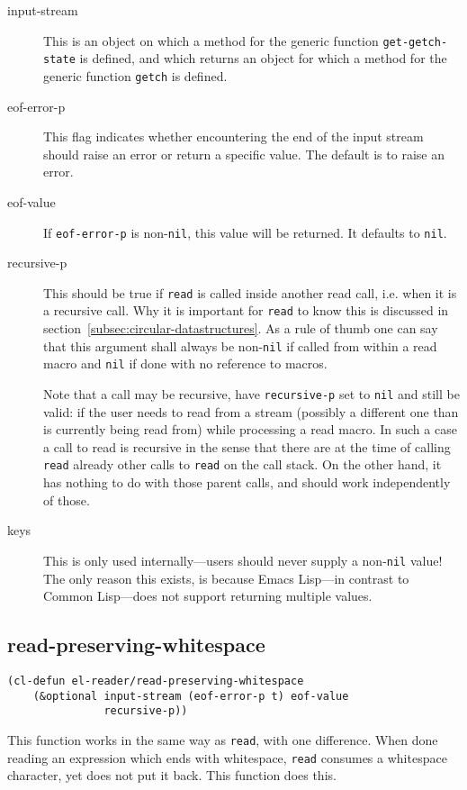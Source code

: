 \documentclass[a4paper,10pt,twoside]{report}
\newcommand{\el}{Emacs Lisp}
\newcommand{\cl}{Common Lisp}
\newcommand{\sym}[1]{\texttt{#1}}
\newcommand{\fun}[1]{\texttt{#1}}
\newcommand{\Read}{\fun{read}}
\newcommand{\nil}{\sym{nil}}
\begin{document}
\begin{description}
\item[input-stream] This is an object on which a method for the generic function
  \fun{get-getch-state} is defined, and which returns an object for which a
  method for the generic function \fun{getch} is defined.
\item[eof-error-p] This flag indicates whether encountering the end of the input
  stream should raise an error or return a specific value.  The default is to
  raise an error. 
\item[eof-value] If \sym{eof-error-p} is non-\nil{}, this value will be
  returned.  It defaults to \nil{}.
\item[recursive-p] This should be true if \Read{} is called inside another read
  call, i.e. when it is a recursive call.  Why it is important for \Read{} to
  know this is discussed in section~\ref{subsec:circular-datastructures}.  As a
  rule of thumb one can say that this argument shall always be non-\nil{} if
  called from within a read macro and \nil{} if done with no reference to
  macros.

  Note that a call may be recursive, have \sym{recursive-p} set to \nil{} and
  still be valid: if the user needs to read from a stream (possibly a different
  one than is currently being read from) while processing a read macro.  In such
  a case a call to read is recursive in the sense that there are at the time of
  calling \Read{} already other calls to \Read{} on the call stack.  On the
  other hand, it has nothing to do with those parent calls, and should work
  independently of those.
\item[keys] This is only used internally---users should never supply a
  non-\nil{} value!  The only reason this exists, is because \el{}---in contrast
  to \cl{}---does not support returning multiple values.
\end{description}

\subsection{read-preserving-whitespace}
\label{subsec:read-preserving-whitespace}

\begin{lstlisting}[style=lispinline]
(cl-defun el-reader/read-preserving-whitespace
    (&optional input-stream (eof-error-p t) eof-value
               recursive-p))
\end{lstlisting}

This function works in the same way as \Read{}, with one difference.  When done
reading an expression which ends with whitespace, \Read{} consumes a whitespace
character, yet does not put it back.  This function does this.
\end{document}
